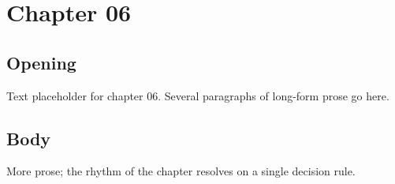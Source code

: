 \chapter{Chapter 06}
\section{Opening}
Text placeholder for chapter 06. Several paragraphs of long-form prose go here.
\section{Body}
More prose; the rhythm of the chapter resolves on a single decision rule.
